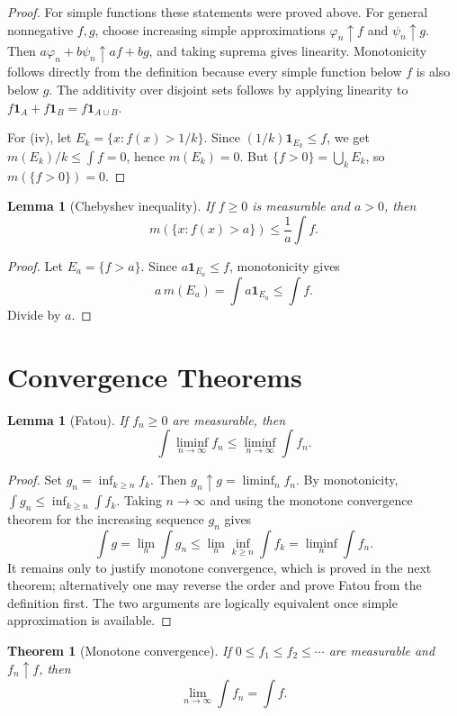 \documentclass[11pt,openany]{book}
\numberwithin{equation}{chapter}
\theoremstyle{definition}
\theoremstyle{plain}
\newtheorem{theorem}[definition]{Theorem}
\newtheorem{lemma}[definition]{Lemma}
\theoremstyle{remark}
\newcommand{\1}{\mathbf{1}}
\begin{document}
\begin{proof}
For simple functions these statements were proved above.  For general nonnegative \(f,g\), choose increasing simple approximations \(\varphi_n\uparrow f\) and \(\psi_n\uparrow g\).  Then \(a\varphi_n+b\psi_n\uparrow af+bg\), and taking suprema gives linearity.  Monotonicity follows directly from the definition because every simple function below \(f\) is also below \(g\).  The additivity over disjoint sets follows by applying linearity to \(f\1_A+f\1_B=f\1_{A\cup B}\).

For (iv), let \(E_k=\{x:f(x)>1/k\}\).  Since \((1/k)\1_{E_k}\le f\), we get \(m(E_k)/k\le\int f=0\), hence \(m(E_k)=0\).  But \(\{f>0\}=\bigcup_kE_k\), so \(m(\{f>0\})=0\).
\end{proof}

\begin{lemma}[Chebyshev inequality]
If \(f\ge0\) is measurable and \(a>0\), then
\[
    m(\{x:f(x)>a\})\le \frac1a\int f.
\]
\end{lemma}

\begin{proof}
Let \(E_a=\{f>a\}\).  Since \(a\1_{E_a}\le f\), monotonicity gives
\[
    a\,m(E_a)=\int a\1_{E_a}\le\int f.
\]
Divide by \(a\).
\end{proof}

\section{Convergence Theorems}

\begin{lemma}[Fatou]
If \(f_n\ge0\) are measurable, then
\[
    \int \liminf_{n\to\infty}f_n\le \liminf_{n\to\infty}\int f_n.
\]
\end{lemma}

\begin{proof}
Set \(g_n=\inf_{k\ge n}f_k\).  Then \(g_n\uparrow g=\liminf_nf_n\).  By monotonicity, \(\int g_n\le\inf_{k\ge n}\int f_k\).  Taking \(n\to\infty\) and using the monotone convergence theorem for the increasing sequence \(g_n\) gives
\[
    \int g=\lim_n\int g_n\le\lim_n\inf_{k\ge n}\int f_k=\liminf_n\int f_n.
\]
It remains only to justify monotone convergence, which is proved in the next theorem; alternatively one may reverse the order and prove Fatou from the definition first.  The two arguments are logically equivalent once simple approximation is available.
\end{proof}

\begin{theorem}[Monotone convergence]
If \(0\le f_1\le f_2\le\cdots\) are measurable and \(f_n\uparrow f\), then
\[
    \lim_{n\to\infty}\int f_n=\int f.
\]
\end{theorem}
\end{document}
